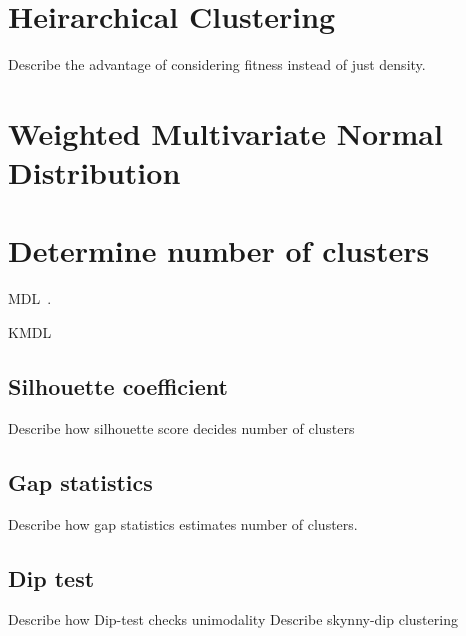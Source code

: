 \section{Heirarchical Clustering}
Describe the advantage of considering fitness instead of just density.


\section{Weighted Multivariate Normal Distribution}


\section{Determine number of clusters}

MDL~\cite{Rissanen:1984:Universal}.

KMDL~\cite{Kyrgyzov:2007:KMDL}

\subsection{Silhouette coefficient}
Describe how silhouette score decides number of clusters 
\subsection{Gap statistics}
Describe how gap statistics estimates number of clusters.
\subsection{Dip test}
Describe how Dip-test checks unimodality
Describe skynny-dip clustering



